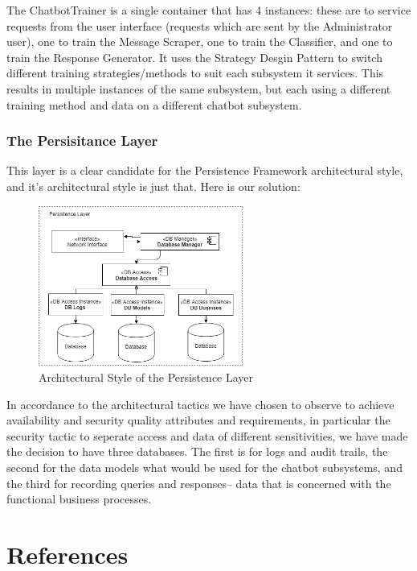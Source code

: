 \documentclass[11pt]{article}
\begin{document}
The ChatbotTrainer is a single container that has 4 instances: these are to service requests from the user interface (requests which are sent by the Administrator user), one to train the Message Scraper, one to train the Classifier, and one to train the Response Generator. It uses the Strategy Desgin Pattern to switch different training strategies/methods to suit each subsystem it services. This results in multiple instances of the same subsystem, but each using a different training method and data on a different chatbot subsystem.

\subsubsection{The Persisitance Layer}
This layer is a clear candidate for the Persistence Framework architectural style, and it's architectural style is just that. Here is our solution:

\begin{figure}[H]
	\centering
	\includegraphics[width=0.6\textwidth]{../../images/Persistence_Layer_Architecture.png}
	\caption{Architectural Style of the Persistence Layer}
\end{figure}

In accordance to the architectural tactics we have chosen to observe to achieve availability and security quality attributes and requirements, in particular the security tactic to seperate access and data of different sensitivities, we have made the decision to have three databases. The first is for logs and audit trails, the second for the data models what would be used for the chatbot subsystems, and the third for recording queries and responses-- data that is concerned with the functional business processes.

\section{References}


\end{document}
